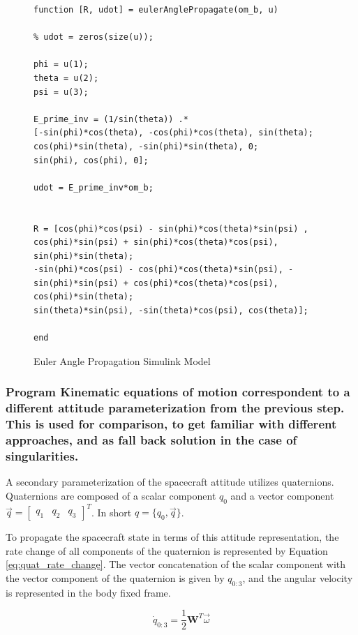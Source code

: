 \begin{figure} [H]
    \centering
    \begin{lstlisting}
function [R, udot] = eulerAnglePropagate(om_b, u)

% udot = zeros(size(u));

phi = u(1);
theta = u(2);
psi = u(3);

E_prime_inv = (1/sin(theta)) .* 
[-sin(phi)*cos(theta), -cos(phi)*cos(theta), sin(theta);
cos(phi)*sin(theta), -sin(phi)*sin(theta), 0;
sin(phi), cos(phi), 0];

udot = E_prime_inv*om_b;


R = [cos(phi)*cos(psi) - sin(phi)*cos(theta)*sin(psi) , cos(phi)*sin(psi) + sin(phi)*cos(theta)*cos(psi), sin(phi)*sin(theta);
-sin(phi)*cos(psi) - cos(phi)*cos(theta)*sin(psi), -sin(phi)*sin(psi) + cos(phi)*cos(theta)*cos(psi), cos(phi)*sin(theta);
sin(theta)*sin(psi), -sin(theta)*cos(psi), cos(theta)];

end
    \end{lstlisting}
    \caption{Euler Angle Propagation Simulink Model}
    \label{fig:euler_angle_prop_model}
\end{figure}

\subsubsection{Program Kinematic equations of motion correspondent to a different attitude parameterization from the previous step. This is used for comparison, to get familiar with different approaches, and as fall back solution in the case of singularities.}

A secondary parameterization of the spacecraft attitude utilizes quaternions. Quaternions are composed of a scalar component $q_0$ and a vector component $\vec{q} = \begin{bmatrix}  q_1 & q_2 & q_3  \end{bmatrix}^T$. In short $q = \{q_0, \vec{q}\}$. 

To propagate the spacecraft state in terms of this attitude representation, the rate change of all components of the quaternion is represented by Equation \ref{eq:quat_rate_change}. The vector concatenation of the scalar component with the vector component of the quaternion is given by $q_{0:3}$, and the angular velocity is represented in the body fixed frame.

\begin{equation} \label{eq:quat_rate_change}
    \dot{q}_{0:3} = \frac{1}{2} \boldsymbol{W}^T \vec{\omega}
\end{equation}

